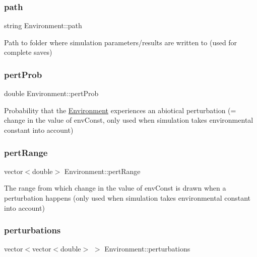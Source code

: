 \subsubsection{\texorpdfstring{path}{path}}
{\footnotesize\ttfamily string Environment\+::path\hspace{0.3cm}{\ttfamily [protected]}}

Path to folder where simulation parameters/results are written to (used for complete saves) \hypertarget{classEnvironment_ae56ec7b378c091a2173281b01d87249b}{}\label{classEnvironment_ae56ec7b378c091a2173281b01d87249b} 
\subsubsection{\texorpdfstring{pert\+Prob}{pertProb}}
{\footnotesize\ttfamily double Environment\+::pert\+Prob\hspace{0.3cm}{\ttfamily [protected]}}

Probability that the \hyperlink{classEnvironment}{Environment} experiences an abiotical perturbation (= change in the value of env\+Const, only used when simulation takes environmental constant into account) \hypertarget{classEnvironment_af1c4ab4f5795e5c789bcd76f80736c5c}{}\label{classEnvironment_af1c4ab4f5795e5c789bcd76f80736c5c} 
\subsubsection{\texorpdfstring{pert\+Range}{pertRange}}
{\footnotesize\ttfamily vector$<$double$>$ Environment\+::pert\+Range\hspace{0.3cm}{\ttfamily [protected]}}

The range from which change in the value of env\+Const is drawn when a perturbation happens (only used when simulation takes environmental constant into account) \hypertarget{classEnvironment_a9339f48bc16de4c77313f70d4f201458}{}\label{classEnvironment_a9339f48bc16de4c77313f70d4f201458} 
\subsubsection{\texorpdfstring{perturbations}{perturbations}}
{\footnotesize\ttfamily vector$<$vector$<$double$>$ $>$ Environment\+::perturbations\hspace{0.3cm}{\ttfamily [protected]}}

